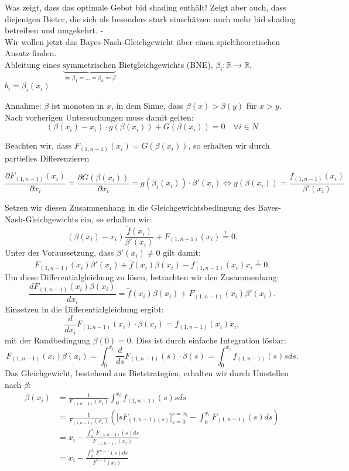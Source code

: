 \documentclass[12pt]{extreport} %
\theoremstyle{named}
\theoremstyle{nnamed}
\theoremstyle{itshape}
\theoremstyle{normal}
\begin{document}
Was zeigt, dass das optimale Gebot bid shading enthält! Zeigt aber auch, dass diejenigen Bieter, die sich als besonders stark einschätzen auch mehr bid shading betreiben und umgekehrt. -\\

Wir wollen jetzt das Bayes-Nash-Gleichgewicht über einen spieltheoretischen Ansatz finden.  \\

Ableitung eines $\underbrace{\text{symmetrischen}}_{\iff \beta_{1} = \dotsc = \beta_{n} \eqqcolon \beta}$ Bietgleichgewichts (BNE), $\beta_{i} \colon \mathbb{R} \rightarrow \mathbb{R}$, $b_{i} = \beta_{i}(x_{i})$

Annahme: $\beta$ ist monoton in $x$, in dem Sinne, dass $\beta(x) > \beta(y)$ für $x > y$. ~\\

Nach vorherigen Untersuchungen muss damit gelten:
$$ \left( \beta(x_i) - x_{i} \right) \cdot g(\beta(x_{i})) + G(\beta(x_{i}))  = 0 \quad \forall i \in N $$

Beachten wir, dass $F_{(1,n-1)}(x_{i}) = G(\beta(x_{i}))$, so erhalten wir durch partielles Differenzieren

$$ \frac{\partial F_{(1,n-1)}(x_{i})}{\partial x_{i}} = \frac{\partial G(\beta(x_{i}))}{\partial x_{i}} = g(\beta_{i}(x_{i})) \cdot \beta'(x_{i}) \iff g(\beta(x_{i})) = \frac{f_{(1, n-1)}(x_{i})}{\beta'(x_{i})} $$

Setzen wir diesen Zusammenhang in die Gleichgewichtsbedingung des Bayes-Nash-Gleichgewichts ein, so erhalten wir:  $$(\beta(x_{i}) - x_{i}) \frac{\tilde{f}(x_{i})}{\beta'(x_{i})} + F_{(1,n-1)}(x_{i}) \overset{!}{=} 0.$$
Unter der Voraussetzung, dass $\beta'(x_i) \neq 0$ gilt damit:
$$ F_{(1, n-1)}(x_{i}) \beta'(x_{i}) + \tilde{f}(x_{i}) \beta(x_{i}) - f_{(1, n-1)}(x_{i}) x_{i} \overset{!}{=} 0. $$
Um diese Differentialgleichung zu lösen, betrachten wir den Zusammenhang:
$$ \frac{d F_{(1,n-1)}(x_{i}) \beta(x_{i})}{d x_{i}} = \tilde{f}(x_{i}) \beta(x_{i}) + F_{(1, n-1)}(x_{i}) \beta'(x_{i}). $$
Einsetzen in die Differentialgleichung ergibt:
$$ \frac{d}{dx_{i}} F_{(1,n-1)}(x_{i}) \cdot \beta(x_{i}) = f_{(1, n-1)}(x_{i}) x_{i}, $$
mit der Randbedingung $\beta(0) = 0$. Dies ist durch  einfache Integration lösbar:
$$ F_{(1, n-1)}(x_{i}) \beta(x_{i}) = \int_{0}^{x_{i}} \frac{d}{ds} F_{(1,n-1)}(s) \cdot \beta(s) = \int_{0}^{x_{i}}  f_{(1, n-1)}(s) s ds. $$
Das Gleichgewicht, bestehend aus Bietstrategien, erhalten wir durch Umstellen nach $\beta$:
\begin{align*}
	\beta(x_{i}) & = \frac{1}{F_{(1, n-1)}(x_{i})}  \int_{0}^{x_{i}}  f_{(1, n-1)}(s) s ds \\
	& = \frac{1}{F_{(1, n-1)}(x_{i})} \left( \big[ s F_{(1,n-1)(s)} \big]_{s=0}^{s=x_{i}} - \int_{0}^{x_{i}}  F_{(1, n-1)}(s)  ds \right) \\
	& = x_{i} - \frac{\int_{0}^{x_{i}} F_{(1, n-1)}(s) ds}{F_{(1,n-1)}(x_{i})} \\
	& = x_{i} - \frac{\int_{0}^{x_{i}} F^{n-1}(s) ds}{F^{n-1}(x_{i})} 
\end{align*}
\end{document}
